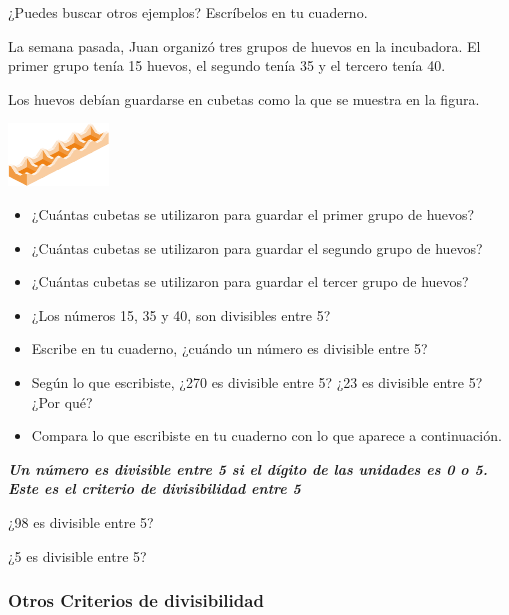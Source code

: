 \documentclass[10pt,twoside]{article}
\begin{document}
¿Puedes buscar otros ejemplos? Escríbelos en tu cuaderno.\\
\begin{minipage}{.7\textwidth}
La semana pasada, Juan organizó tres grupos de huevos en la incubadora. El primer grupo tenía 15 huevos, el segundo tenía 35 y el tercero tenía 40.

Los huevos debían guardarse en cubetas como la que se muestra en la figura.
\end{minipage}
\begin{minipage}{.25\textwidth}
 \begin{center}
 \includegraphics{./Images/minicubeta.png}
\end{center}
\end{minipage}
\begin{itemize}
 \item  ¿Cuántas cubetas se utilizaron para guardar el primer
grupo de huevos?
\item ¿Cuántas cubetas se utilizaron para guardar el segundo
grupo de huevos?
\item ¿Cuántas cubetas se utilizaron para guardar el tercer
grupo de huevos?
\item ¿Los números 15, 35 y 40, son divisibles entre 5?
\item Escribe en tu cuaderno, ¿cuándo un número es divisible
entre 5?
\item Según lo que escribiste, ¿270 es divisible entre 5? ¿23 es
divisible entre 5? ¿Por qué?
\item Compara lo que escribiste en tu cuaderno con lo que
aparece a continuación.
\end{itemize}
\emph{\textbf{Un número es divisible entre 5 si el dígito de las unidades es 0 o 5. Este es el criterio de divisibilidad entre 5}}
\begin{itemize}
\begin{multicols}{2}
 \item ¿98 es divisible entre 5?
 \item ¿5 es divisible entre 5?
 \end{multicols}
\end{itemize}
\subsubsection*{Otros Criterios de divisibilidad}
\end{document}
